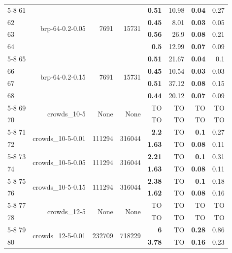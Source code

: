\begin{longtable}{lrr@{\hskip 12pt}r@{\hskip 12pt}r@{\hskip 12pt}r@{\hskip 12pt}r@{\hskip 12pt}r}
\cmidrule{5-8}
61 & \multirow{4}{*}{brp-64-0.2-0.05} & \multirow{4}{*}{7691} & \multirow{4}{*}{15731} & \textbf{0.51} & 10.98 & \textbf{0.04} & 0.27 \\
62 &  &  &  & \textbf{0.45} & 8.01 & \textbf{0.03} & 0.05 \\
63 &  &  &  & \textbf{0.56} & 26.9 & \textbf{0.08} & 0.21 \\
64 &  &  &  & \textbf{0.5} & 12.99 & \textbf{0.07} & 0.09 \\
\cmidrule{5-8}
65 & \multirow{4}{*}{brp-64-0.2-0.15} & \multirow{4}{*}{7691} & \multirow{4}{*}{15731} & \textbf{0.51} & 21.67 & \textbf{0.04} & 0.1 \\
66 &  &  &  & \textbf{0.45} & 10.54 & \textbf{0.03} & 0.03 \\
67 &  &  &  & \textbf{0.51} & 37.12 & \textbf{0.08} & 0.15 \\
68 &  &  &  & \textbf{0.44} & 20.12 & \textbf{0.07} & 0.09 \\
\cmidrule{5-8}
69 & \multirow{2}{*}{crowds\_10-5} & \multirow{2}{*}{None} & \multirow{2}{*}{None} & TO & TO & TO & TO \\
70 &  &  &  & TO & TO & TO & TO \\
\cmidrule{5-8}
71 & \multirow{2}{*}{crowds\_10-5-0.01} & \multirow{2}{*}{111294} & \multirow{2}{*}{316044} & \textbf{2.2} & TO & \textbf{0.1} & 0.27 \\
72 &  &  &  & \textbf{1.63} & TO & \textbf{0.08} & 0.11 \\
\cmidrule{5-8}
73 & \multirow{2}{*}{crowds\_10-5-0.05} & \multirow{2}{*}{111294} & \multirow{2}{*}{316044} & \textbf{2.21} & TO & \textbf{0.1} & 0.31 \\
74 &  &  &  & \textbf{1.63} & TO & \textbf{0.08} & 0.11 \\
\cmidrule{5-8}
75 & \multirow{2}{*}{crowds\_10-5-0.15} & \multirow{2}{*}{111294} & \multirow{2}{*}{316044} & \textbf{2.38} & TO & \textbf{0.1} & 0.18 \\
76 &  &  &  & \textbf{1.62} & TO & \textbf{0.08} & 0.16 \\
\cmidrule{5-8}
77 & \multirow{2}{*}{crowds\_12-5} & \multirow{2}{*}{None} & \multirow{2}{*}{None} & TO & TO & TO & TO \\
78 &  &  &  & TO & TO & TO & TO \\
\cmidrule{5-8}
79 & \multirow{2}{*}{crowds\_12-5-0.01} & \multirow{2}{*}{232709} & \multirow{2}{*}{718229} & \textbf{6} & TO & \textbf{0.28} & 0.86 \\
80 &  &  &  & \textbf{3.78} & TO & \textbf{0.16} & 0.23 \\

\end{longtable}
